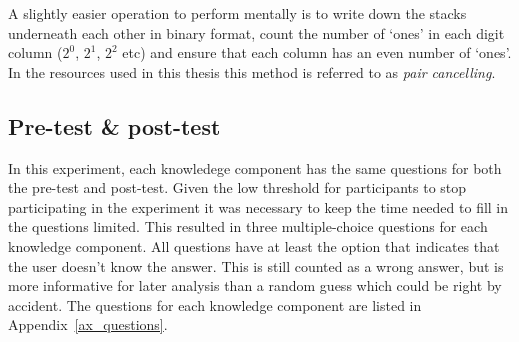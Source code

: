 A slightly easier operation to perform mentally is to write down the stacks
underneath each other in binary format, count the number of `ones' in each
digit column ($2^0$, $2^1$, $2^2$ etc) and ensure that each column has an even
number of `ones'. In the resources used in this thesis this method is referred
to as \emph{pair cancelling}.
\subsection{Pre-test \& post-test}
\label{sec:setup_tests}
In this experiment, each knowledege component has the same questions for both
the pre-test and post-test. Given the low threshold for participants to stop
participating in the experiment it was necessary to keep the time needed to
fill in the questions limited. This resulted in three multiple-choice
questions for each knowledge component. All questions have at least the option that
indicates that the user doesn't know the answer. This is still counted as a
wrong answer, but is more informative for later analysis than a random guess
which could be right by accident. The questions for each knowledge component
are listed in Appendix~\ref{ax_questions}.

